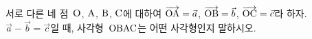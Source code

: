 서로 다른 네 점~$\mathrm{O}$, $\mathrm{A}$, $\mathrm{B}$, $\mathrm{C}$에 대하여 $\overrightarrow{\mathrm{OA}}=\vec{a}$, $\overrightarrow{\mathrm{OB}}=\vec{b}$, $\overrightarrow{\mathrm{OC}}=\vec{c}$라 하자. $\vec{a}-\vec{b}=\vec{c}$일 때, 사각형~$\mathrm{OBAC}$는 어떤 사각형인지 말하시오.
